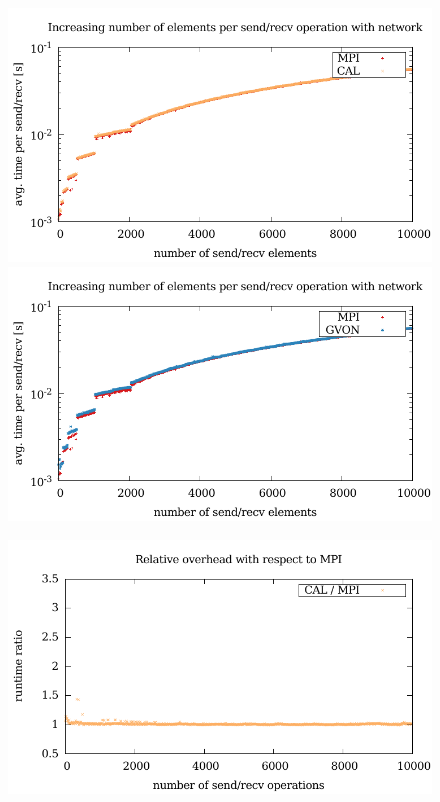 \begin{figure}[H]
  \begin{minipage}[t]{0.5\textwidth}
    \includegraphics[width=\textwidth]{plots/50_nsize_network_cal_laser}
    \includegraphics[width=\textwidth]{plots/50_nsize_network_gvon_laser}
  \end{minipage}%
  \begin{minipage}[t]{0.5\textwidth}
    \includegraphics[width=\textwidth]{plots/50_nsize_network_overhead_cal_laser}

\end{minipage}
\end{figure}
